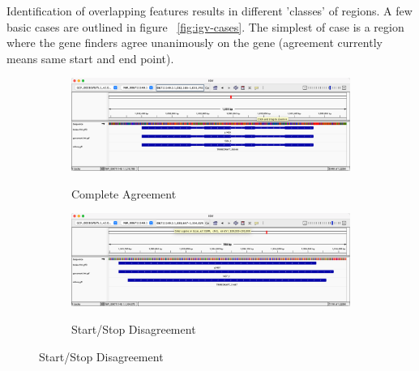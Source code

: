 Identification of overlapping features results in different 'classes'
of regions. A few basic cases are outlined in figure
~\ref{fig:igv-cases}. The simplest of case is a region where the
gene finders agree unanimously on the gene (agreement currently means
same start and end point). 


\begin{figure}[b]
  \centering
  \begin{subfigure}{0.9\textwidth}
    \includegraphics[width=\textwidth]{figures/igv/igv-agreement-thin.png}
    \label{fig:igv-agree}
    \caption{Complete Agreement}
  \end{subfigure}
  \begin{subfigure}{0.9\textwidth}
    \includegraphics[width=\textwidth]{figures/igv/igv-start-stop-thin.png}
    \label{fig:igv-start-stop}
    \caption{Start/Stop Disagreement}
  \end{subfigure}
\end{figure}
